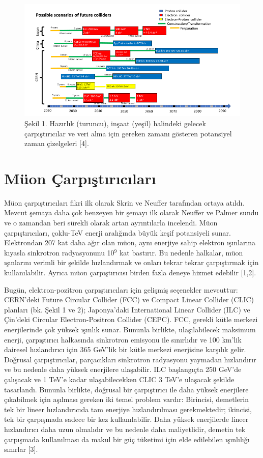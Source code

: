 \documentclass{article}
\begin{document}
  \begin{figure}[h]
 \centering
\includegraphics[width=14cm]{image/Ekran Görüntüsü - 2021-06-23 10-37-41.png}
\caption*{Şekil 1. Hazırlık (turuncu), inşaat (yeşil) halindeki gelecek çarpıştırıcılar ve veri alma için gereken zamanı gösteren potansiyel zaman çizelgeleri [4].}
	\end{figure}

 
 \section{Müon Çarpıştırıcıları}
 
 Müon çarpıştırıcıları fikri ilk olarak Skrin ve Neuffer tarafından ortaya atıldı. Mevcut şemaya daha çok benzeyen bir şemayı ilk olarak Neuffer ve Palmer sundu ve o zamandan beri sürekli olarak artan ayrıntılarla incelendi. Müon çarpıştırıcıları, çoklu-TeV enerji aralığında büyük keşif potansiyeli sunar. Elektrondan 207 kat daha ağır olan müon, aynı enerjiye sahip elektron ışınlarına kıyasla sinkrotron radyasyonunu 10$^{9}$ kat bastırır. Bu nedenle halkalar, müon ışınlarını verimli bir şekilde hızlandırmak ve onları tekrar tekrar çarpıştırmak için kullanılabilir. Ayrıca müon çarpıştırıcısı birden fazla deneye hizmet edebilir [1,2].
 
 Bugün, elektron-pozitron çarpıştırıcıları için gelişmiş seçenekler mevcuttur: CERN'deki Future Circular Collider (FCC) ve Compact Linear Collider (CLIC) planları (bk. Şekil 1 ve 2); Japonya'daki International Linear Collider (ILC) ve Çin'deki Circular Electron-Positron Collider (CEPC). FCC, gerekli kütle merkezi enerjilerinde çok yüksek ışınlık sunar. Bununla birlikte, ulaşılabilecek maksimum enerji, çarpıştırıcı halkasında sinkrotron emisyonu ile sınırlıdır ve 100 km'lik dairesel hızlandırıcı için 365 GeV'lik bir kütle merkezi enerjisine karşılık gelir. Doğrusal çarpıştırıcılar, parçacıkları sinkrotron radyasyonu yaymadan hızlandırır ve bu nedenle daha yüksek enerjilere ulaşabilir. ILC başlangıçta 250 GeV'de çalışacak ve 1 TeV'e kadar ulaşabilecekken CLIC 3 TeV'e ulaşacak şekilde tasarlandı. Bununla birlikte, doğrusal bir çarpıştırıcı ile daha yüksek enerjilere çıkabilmek için aşılması gereken iki temel problem vardır: Birincisi, demetlerin tek bir lineer hızlandırıcıda tam enerjiye hızlandırılması gerekmektedir; ikincisi, tek bir çarpışmada sadece bir kez kullanılabilir. Daha yüksek enerjilerde lineer hızlandırıcı daha uzun olmalıdır ve bu nedenle daha maliyetlidir, demetin tek çarpışmada kullanılması da makul bir güç tüketimi için elde edilebilen ışınlılığı sınırlar [3].
 
\end{document}

